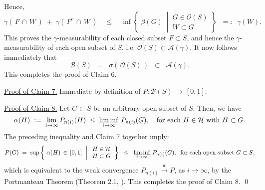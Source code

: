 Hence,
\begin{equation*}
\gamma(\,F\,\cap\,W\,) \;+\; \gamma(\,F^{c}\,\cap\,W\,)
\quad\leq\quad
\inf\left\{\;
\beta(G)
\;\;\left\vert\,
\begin{array}{c} G \in \mathcal{O}(S) \\ W \subset G \end{array}
\right.
\right\}
\;\; =: \;\; \gamma(W).
\end{equation*}
This proves the $\gamma$-measurability of each closed subset $F \subset S$,
and hence the $\gamma$-measurability of each open subset of $S$,
i.e. $\mathcal{O}(S) \subset \mathcal{A}(\gamma)$.
It now follows immediately that
\begin{equation*}
\mathcal{B}(S)
\;\; = \;\; \sigma\!\left(\,\mathcal{O}(S)\,\right)
\;\; \subset \;\; \mathcal{A}(\gamma).
\end{equation*}
This completes the proof of Claim 6.

\vskip 0.5cm
\noindent
\underline{Proof of Claim 7:}\quad
Immediate by definition of $P : \mathcal{B}(S) \,\longrightarrow\, [0,1]$.

\vskip 0.5cm
\noindent
\underline{Proof of Claim 8:}\quad
Let $G \subset S$ be an arbitrary open subset of $S$.
Then, we have
\begin{equation*}
\alpha(H)
\; := \; \lim_{i\rightarrow\infty}P_{n(i)}(H)
\;\leq\; \liminf_{i\rightarrow\infty}\,P_{n(i)}(G),
\quad
\textnormal{for each $H \in \mathcal{H}$ with $H \subset G$}.
\end{equation*}
The preceding inequality and Claim 7 together imply:
\begin{equation*}
P(G)
\; = \;
\sup\left\{\;
\alpha(H) \,\in\, [0,1]
\,\;\left\vert\;
\begin{array}{l} H \in \mathcal{H} \\ H \subset G \end{array}
\right.
\right\}
\;\;\leq\;\;
\liminf_{i\rightarrow\infty}\,P_{n(i)}(G),
\;\;
\textnormal{for each open subset $G \subset S$},
\end{equation*}
which is equivalent to the weak convergence
$P_{n(i)} \overset{w}{\longrightarrow} P$, as $i \longrightarrow \infty$,
by the Portmanteau Theorem (Theorem 2.1, \cite{Billingsley1999}).
This completes the proof of Claim 8.
\qed

\renewcommand{\theenumi}{\roman{enumi}}
\renewcommand{\labelenumi}{\textnormal{(\theenumi)}$\;\;$}

